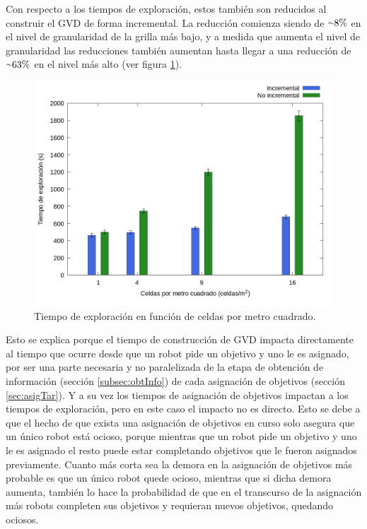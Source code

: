 Con respecto a los tiempos de exploración, estos también son reducidos al
construir el GVD de forma incremental. La reducción comienza siendo de
${\smallsim}8\%$ en el nivel de granularidad de la grilla más bajo, y a medida que aumenta el
nivel de granularidad las reducciones también aumentan hasta llegar a una
reducción de ${\smallsim}63\%$ en el nivel más alto (ver figura \ref{fig:gra:inc:et}).
\begin{figure}[!h]
  \centerfloat
  \includegraphics[clip=true, width=\graphlen]{imagenes/graficas_chicas/graficas_histo_num/incrementalidad/exploration_time.png}
  \caption{Tiempo de exploración en función de celdas por metro cuadrado.}\label{fig:gra:inc:et}
\end{figure}
Esto se explica porque el
tiempo de construcción de GVD impacta directamente al tiempo que ocurre desde
que un robot pide un objetivo y uno le es asignado, por ser una parte necesaria y
no paralelizada de la etapa de obtención de información (sección
\ref{subsec:obtInfo}) de cada asignación de objetivos (sección
\ref{sec:asigTar}). Y a su vez los tiempos de asignación de objetivos impactan
a los tiempos de exploración, pero en este caso el impacto no es directo. Esto
se debe a que el hecho de que exista una asignación de objetivos en curso solo
asegura que un único robot está ocioso, porque mientras que un robot pide un
objetivo y uno le es asignado el resto puede estar completando objetivos que le
fueron asignados previamente. Cuanto más corta sea la demora en la asignación
de objetivos más probable es que un único robot quede ocioso, mientras que si
dicha demora aumenta, también lo hace la probabilidad de que en el transcurso de
la asignación más robots completen sus objetivos y requieran nuevos objetivos,
quedando ociosos. 

